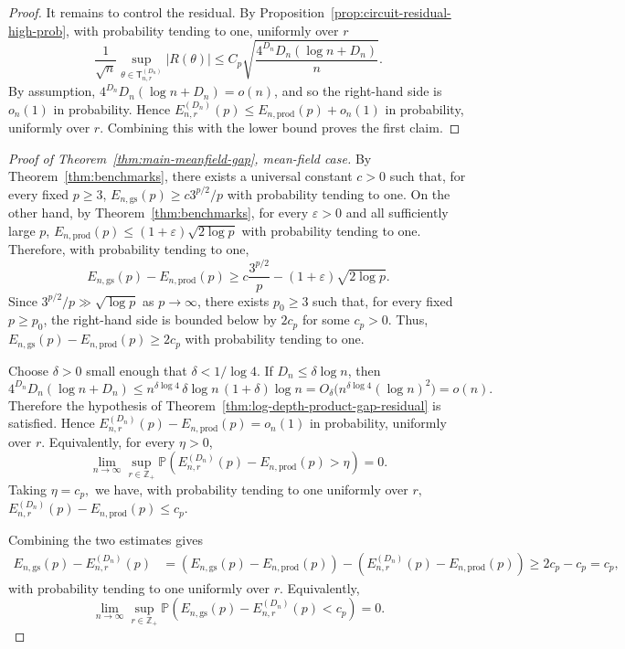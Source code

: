 \documentclass[12pt]{article}
\renewcommand{\P}{\mathbb{P}}
\begin{document}
\begin{proof}
It remains to control the residual. By
Proposition~\ref{prop:circuit-residual-high-prob}, with probability tending to
one, uniformly over $r$
\[
\frac1{\sqrt n}
\sup_{\theta \in \mathsf{T}_{n,r}^{(D_n)}}
|
R(\theta)
|
\le
C_p
\sqrt{
\frac{4^{D_n}D_n(\log n+D_n)}{n}
}.
\]
By assumption, $4^{D_n}D_n(\log n+D_n)=o(n)$, and so the right-hand side is \(o_n(1)\) in probability. Hence $E_{n,r}^{(D_n)}(p)
\le
E_{n,\mathrm{prod}}(p)+o_n(1)$ in probability, uniformly over $r$. Combining this with the lower bound proves the first claim.
\end{proof}


\begin{proof}[Proof of Theorem~\ref{thm:main-meanfield-gap}, mean-field case]
By Theorem~\ref{thm:benchmarks}, there exists a universal constant
\(c>0\) such that, for every fixed \(p\ge3\), $E_{n,\mathrm{gs}}(p) \ge c3^{p/2}/p$ with probability tending to one. On the other hand, by Theorem~\ref{thm:benchmarks}, for every \(\varepsilon>0\) and all
sufficiently large $p$, $E_{n,\mathrm{prod}}(p)
    \le
    (1+\varepsilon)\sqrt{2\log p}$ with probability tending to one. Therefore, with probability tending to one,
\[
    E_{n,\mathrm{gs}}(p)-E_{n,\mathrm{prod}}(p)
    \ge
    c\frac{3^{p/2}}{p}
    -
    (1+\varepsilon)\sqrt{2\log p}.
\]
Since \(3^{p/2}/p\gg\sqrt{\log p}\) as \(p\to\infty\), there exists
\(p_0\ge3\) such that, for every fixed \(p\ge p_0\), the right-hand side is
bounded below by \(2c_p\) for some \(c_p>0\). Thus, $E_{n,\mathrm{gs}}(p)-E_{n,\mathrm{prod}}(p)
    \ge
    2c_p$ with probability tending to one.

Choose \(\delta>0\) small enough that \(\delta<1/\log 4\). If \(D_n\le \delta\log n\), then
\[
    4^{D_n}D_n(\log n+D_n)
    \le
    n^{\delta\log 4}\,\delta\log n\, (1+\delta)\log n
    =
    O_\delta\bigl(n^{\delta\log 4}(\log n)^2\bigr)
    =
    o(n).
\]
Therefore the hypothesis of
Theorem~\ref{thm:log-depth-product-gap-residual} is satisfied. Hence $E_{n,r}^{(D_n)}(p)-E_{n,\mathrm{prod}}(p)=o_n(1)$ in probability, uniformly over $r$. Equivalently, for every \(\eta>0\),
\[
\lim_{n\to\infty}
\sup_{r\in\mathbb Z_+}
\P\left(
    E_{n,r}^{(D_n)}(p)-E_{n,\mathrm{prod}}(p)>\eta
\right)
=0.
\]
Taking $\eta= c_p,$ we have, with probability tending to one uniformly over $r,$ $E_{n,r}^{(D_n)}(p)-E_{n,\mathrm{prod}}(p) \le c_p .$

Combining the two estimates gives
\begin{align*}
E_{n,\mathrm{gs}}(p)-E_{n,r}^{(D_n)}(p)
&=
\left(
E_{n,\mathrm{gs}}(p)-E_{n,\mathrm{prod}}(p)
\right)
-
\left(
E_{n,r}^{(D_n)}(p)-E_{n,\mathrm{prod}}(p)
\right)\ge 2c_p - c_p = c_p,
\end{align*}
with probability tending to one uniformly over $r$. Equivalently,
\[
\lim_{n\to\infty}
\sup_{r\in\mathbb Z_+}
\P\left(
    E_{n,\mathrm{gs}}(p)-E_{n,r}^{(D_n)}(p)<c_p
\right)
=0.
\]
\end{proof}
\end{document}
